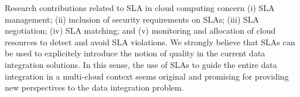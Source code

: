 Research contributions related to SLA in cloud computing concern (i) SLA management; (ii) inclusion of security requirements on SLAs; (iii) SLA negotiation; (iv) SLA matching; and (v) monitoring and allocation of cloud resources to detect and avoid SLA violations. 
We strongly believe that SLAs can be used  to explicitely introduce the notion of quality in the current data integration solutions. In this sense, the use of SLAs to guide the entire data integration in a multi-cloud context seems original and promising for providing new perspectives to the data integration problem.
